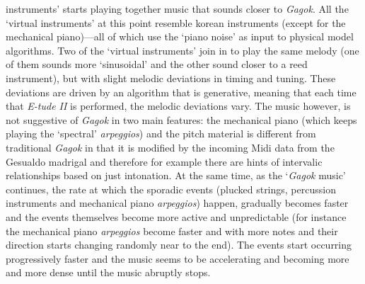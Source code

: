 instruments' starts playing together music that sounds closer to \emph{Gagok}. All the `virtual instruments' at this point resemble korean instruments (except for the mechanical piano)---all of which use the `piano noise' as input to physical model algorithms. Two of the `virtual instruments' join in to play the same melody (one of them sounds more `sinusoidal' and the other sound closer to a reed instrument), but with slight melodic deviations in timing and tuning. These deviations are driven by an algorithm that is generative, meaning that each time that \emph{E-tude II} is performed, the melodic deviations vary. The music however, is not suggestive of \emph{Gagok} in two main features: the mechanical piano (which keeps playing the `spectral' \emph{arpeggios}) and the pitch material is different from traditional \emph{Gagok} in that it is modified by the incoming Midi data from the Gesualdo madrigal and therefore for example there are hints of intervalic relationships based on just intonation. At the same time, as the `\emph{Gagok} music' continues, the rate at which the sporadic events (plucked strings, percussion instruments and mechanical piano \emph{arpeggios}) happen, gradually becomes faster and the events themselves become more active and unpredictable (for instance the mechanical piano \emph{arpeggios} become faster and with more notes and their direction starts changing randomly near to the end). The events start occurring progressively faster and the music seems to be accelerating and becoming more and more dense until the music abruptly stops.

